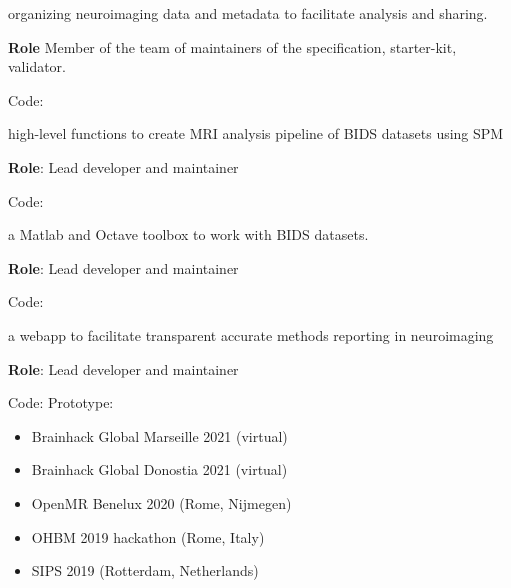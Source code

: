 
 organizing neuroimaging data and metadata to facilitate analysis and sharing.

\textbf{Role} Member of the team of maintainers of the specification, starter-kit, validator.

\textbullet Code: 

\vspace{5mm}


 high-level functions to create MRI analysis pipeline of BIDS datasets using SPM

\textbf{Role}: Lead developer and maintainer

\textbullet Code: 

\vspace{5mm}


 a Matlab and Octave toolbox to work with BIDS datasets.

\textbf{Role}: Lead developer and maintainer

\textbullet Code: 

\vspace{5mm}


 a webapp to facilitate transparent accurate methods reporting in neuroimaging

\textbf{Role}: Lead developer and maintainer

\textbullet Code:  
\textbullet {}
\textbullet Prototype: 

\vspace{5mm}



\begin{itemize}
    \item Brainhack Global Marseille 2021 (virtual) 
    \item Brainhack Global Donostia 2021 (virtual) 
    \item OpenMR Benelux 2020 (Rome, Nijmegen) 
    \item OHBM 2019 hackathon (Rome, Italy) 
\end{itemize}

\begin{itemize}
    \item SIPS 2019 (Rotterdam, Netherlands)
\end{itemize}

